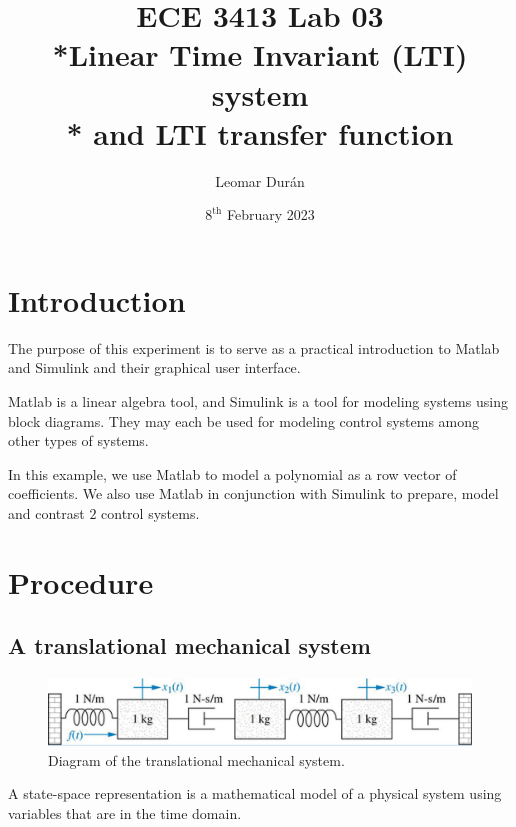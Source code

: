 \documentclass[12pt]{article}
\title{ECE 3413 Lab 03\\*Linear Time Invariant (LTI) system\\* and LTI transfer function}
\author{Leomar Dur\'an}
\date{$8^{\text{th}}$ February 2023}
\begin{document}
\maketitle
\newpage

\section{Introduction}

The purpose of this experiment is to serve as a practical introduction to Matlab and Simulink and their graphical user interface.

Matlab is a linear algebra tool, and Simulink is a tool for modeling systems using block diagrams.
They may each be used for modeling control systems among other types of systems.

In this example, we use Matlab to model a polynomial as a row vector of coefficients.
We also use Matlab in conjunction with Simulink to prepare, model and contrast $2$ control systems.

\section{Procedure}

\subsection{A translational mechanical system}

\begin{figure}[h]
    \centering
    \includegraphics[width=\linewidth]{part01_translational_mechanical_system.png}
    \caption{Diagram of the translational mechanical system.}
    \label{fig:translational mechanical system}
\end{figure}

A state-space representation is a mathematical model of a physical system using variables that are in the time domain.
\end{document}
